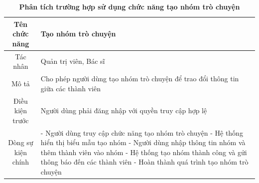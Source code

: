 \begin{table}[H]
	\caption{\bfseries \fontsize{12pt}{0pt}\selectfont Phân tích trường hợp sử dụng chức năng tạo nhóm trò chuyện}
	\centering
	\begin{tabularx}{0.9\textwidth}{|c|X|}
		\hline
		\textbf{Tên chức năng} & \textbf{Tạo nhóm trò chuyện}                                                      \\
		\hline
		Tác nhân               & Quản trị viên, Bác sĩ                                                             \\
		\hline
		Mô tả                  & Cho phép người dùng tạo nhóm trò chuyện để trao đổi thông tin giữa các thành viên \\
		\hline
		Điều kiện trước        & Người dùng phải đăng nhập với quyền truy cập hợp lệ                               \\
		\hline
		Dòng sự kiện chính     &
		- Người dùng truy cập chức năng tạo nhóm trò chuyện \newline
		- Hệ thống hiển thị biểu mẫu tạo nhóm \newline
		- Người dùng nhập thông tin nhóm và thêm thành viên vào nhóm \newline
		- Hệ thống tạo nhóm thành công và gửi thông báo đến các thành viên \newline
		- Hoàn thành quá trình tạo nhóm trò chuyện                                                                 \\
		\hline
	\end{tabularx}
\end{table}

\newpage
